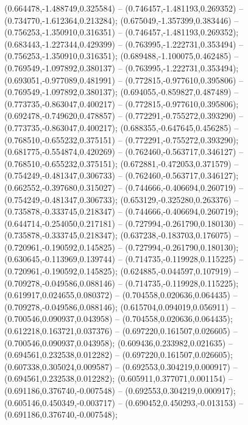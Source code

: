  (0.664478,-1.488749,0.325584) -- (0.746457,-1.481193,0.269352) -- (0.734770,-1.612364,0.213284);
 (0.675049,-1.357399,0.383446) -- (0.756253,-1.350910,0.316351) -- (0.746457,-1.481193,0.269352);
 (0.683443,-1.227344,0.429399) -- (0.763995,-1.222731,0.353494) -- (0.756253,-1.350910,0.316351);
 (0.689488,-1.100075,0.462485) -- (0.769549,-1.097892,0.380137) -- (0.763995,-1.222731,0.353494);
 (0.693051,-0.977089,0.481991) -- (0.772815,-0.977610,0.395806) -- (0.769549,-1.097892,0.380137);
 (0.694055,-0.859827,0.487489) -- (0.773735,-0.863047,0.400217) -- (0.772815,-0.977610,0.395806);
 (0.692478,-0.749620,0.478857) -- (0.772291,-0.755272,0.393290) -- (0.773735,-0.863047,0.400217);
 (0.688355,-0.647645,0.456285) -- (0.768510,-0.655232,0.375151) -- (0.772291,-0.755272,0.393290);
 (0.681775,-0.554874,0.420269) -- (0.762460,-0.563717,0.346127) -- (0.768510,-0.655232,0.375151);
 (0.672881,-0.472053,0.371579) -- (0.754249,-0.481347,0.306733) -- (0.762460,-0.563717,0.346127);
 (0.662552,-0.397680,0.315027) -- (0.744666,-0.406694,0.260719) -- (0.754249,-0.481347,0.306733);
 (0.653129,-0.325280,0.263376) -- (0.735878,-0.333745,0.218347) -- (0.744666,-0.406694,0.260719);
 (0.644714,-0.254050,0.217181) -- (0.727994,-0.261790,0.180130) -- (0.735878,-0.333745,0.218347);
 (0.637238,-0.183703,0.176075) -- (0.720961,-0.190592,0.145825) -- (0.727994,-0.261790,0.180130);
 (0.630645,-0.113969,0.139744) -- (0.714735,-0.119928,0.115225) -- (0.720961,-0.190592,0.145825);
 (0.624885,-0.044597,0.107919) -- (0.709278,-0.049586,0.088146) -- (0.714735,-0.119928,0.115225);
 (0.619917,0.024655,0.080372) -- (0.704558,0.020636,0.064435) -- (0.709278,-0.049586,0.088146);
 (0.615704,0.094019,0.056911) -- (0.700546,0.090937,0.043958) -- (0.704558,0.020636,0.064435);
 (0.612218,0.163721,0.037376) -- (0.697220,0.161507,0.026605) -- (0.700546,0.090937,0.043958);
 (0.609436,0.233982,0.021635) -- (0.694561,0.232538,0.012282) -- (0.697220,0.161507,0.026605);
 (0.607338,0.305024,0.009587) -- (0.692553,0.304219,0.000917) -- (0.694561,0.232538,0.012282);
 (0.605911,0.377071,0.001154) -- (0.691186,0.376740,-0.007548) -- (0.692553,0.304219,0.000917);
 (0.605146,0.450349,-0.003717) -- (0.690452,0.450293,-0.013153) -- (0.691186,0.376740,-0.007548);
